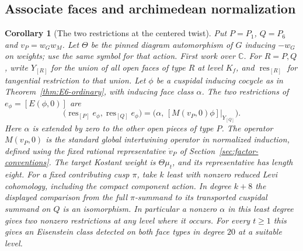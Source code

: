 \documentclass[12pt]{amsart}
\numberwithin{equation}{section}
\theoremstyle{plain}
\newtheorem{corollary}[theorem]{Corollary}
\theoremstyle{definition}
\theoremstyle{remark}
\newcommand{\C}{\mathbb C}
\begin{document}
\subsection{Associate faces and archimedean normalization}
\begin{corollary}[The two restrictions at the centered twist] \label{cor:E6-two-faces}
Put $P=P_1$, $Q=P_6$ and $v_P=w_Gw_M$. Let $\Theta$ be the pinned diagram automorphism of $G$ inducing $-w_G$ on weights; use the same symbol for that action. First work over $\C$. For $R=P,Q$, write $Y_{[R]}$ for the union of all open faces of type $R$ at level $K_f$, and $\operatorname{res}_{[R]}$ for tangential restriction to that union. Let $\phi$ be a cuspidal inducing cocycle as in Theorem~\ref{thm:E6-ordinary}, with inducing face class $\alpha$. The two restrictions of $e_\phi=[E(\phi,0)]$ are
\[
  \bigl(\operatorname{res}_{[P]}e_\phi,\operatorname{res}_{[Q]}e_\phi\bigr)
  =\bigl(\alpha,\,[M(v_P,0)\phi]|_{Y_{[Q]}}\bigr).
\]
Here $\alpha$ is extended by zero to the other open pieces of type $P$. The operator $M(v_P,0)$ is the standard global intertwining operator in normalized induction, defined using the fixed rational representative $\dot v_P$ of Section~\ref{sec:factor-conventions}. The target Kostant weight is $\Theta\mu_t$, and its representative has length eight. For a fixed contributing cusp $\pi$, take $k$ least with nonzero reduced Levi cohomology, including the compact component action. In degree $k+8$ the displayed comparison from the full $\pi$-summand to its transported cuspidal summand on $Q$ is an isomorphism. In particular a nonzero $\alpha$ in this least degree gives two nonzero restrictions at any level where it occurs. For every $t\ge1$ this gives an Eisenstein class detected on both face types in degree $20$ at a suitable level.
\end{corollary}
\end{document}
